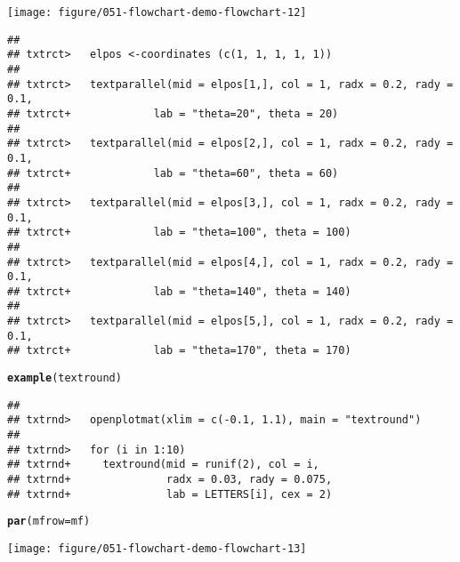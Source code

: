 \documentclass{article}\usepackage[]{graphicx}\usepackage[]{xcolor}
\makeatletter
\def\maxwidth{ %
  \ifdim\Gin@nat@width>\linewidth
    \linewidth
  \else
    \Gin@nat@width
  \fi
}
\newcommand{\hldef}[1]{\textcolor[rgb]{0.345,0.345,0.345}{#1}}%
\newcommand{\hlkwc}[1]{\textcolor[rgb]{0.333,0.667,0.333}{#1}}%
\newcommand{\hlkwd}[1]{\textcolor[rgb]{0.737,0.353,0.396}{\textbf{#1}}}%
\newenvironment{kframe}{%
 \def\at@end@of@kframe{}%
 \ifinner\ifhmode%
  \def\at@end@of@kframe{\end{minipage}}%
  \begin{minipage}{\columnwidth}%
 \fi\fi%
 \def\FrameCommand##1{\hskip\@totalleftmargin \hskip-\fboxsep
 \colorbox{shadecolor}{##1}\hskip-\fboxsep
     \hskip-\linewidth \hskip-\@totalleftmargin \hskip\columnwidth}%
 \MakeFramed {\advance\hsize-\width
   \@totalleftmargin\z@ \linewidth\hsize
   \@setminipage}}%
 {\par\unskip\endMakeFramed%
 \at@end@of@kframe}
\newenvironment{knitrout}{}{} %
\makeatother
\begin{document}
\begin{knitrout}
\texttt{[image: figure/051-flowchart-demo-flowchart-12]} 
\begin{kframe}\begin{verbatim}
## 
## txtrct>   elpos <-coordinates (c(1, 1, 1, 1, 1))
## 
## txtrct>   textparallel(mid = elpos[1,], col = 1, radx = 0.2, rady = 0.1,
## txtrct+             lab = "theta=20", theta = 20)
## 
## txtrct>   textparallel(mid = elpos[2,], col = 1, radx = 0.2, rady = 0.1,
## txtrct+             lab = "theta=60", theta = 60)
## 
## txtrct>   textparallel(mid = elpos[3,], col = 1, radx = 0.2, rady = 0.1,
## txtrct+             lab = "theta=100", theta = 100)
## 
## txtrct>   textparallel(mid = elpos[4,], col = 1, radx = 0.2, rady = 0.1,
## txtrct+             lab = "theta=140", theta = 140)
## 
## txtrct>   textparallel(mid = elpos[5,], col = 1, radx = 0.2, rady = 0.1,
## txtrct+             lab = "theta=170", theta = 170)
\end{verbatim}
\begin{alltt}
\hlkwd{example}\hldef{(textround)}
\end{alltt}
\begin{verbatim}
## 
## txtrnd>   openplotmat(xlim = c(-0.1, 1.1), main = "textround")
## 
## txtrnd>   for (i in 1:10) 
## txtrnd+     textround(mid = runif(2), col = i, 
## txtrnd+               radx = 0.03, rady = 0.075,
## txtrnd+               lab = LETTERS[i], cex = 2)
\end{verbatim}
\begin{alltt}
\hlkwd{par}\hldef{(}\hlkwc{mfrow} \hldef{= mf)}
\end{alltt}
\end{kframe}
\texttt{[image: figure/051-flowchart-demo-flowchart-13]} 
\end{knitrout}
\end{document}
